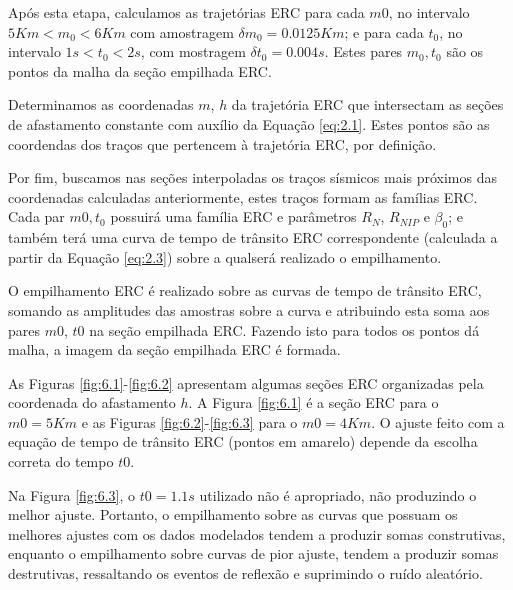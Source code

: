 Após esta etapa, calculamos as trajetórias ERC para cada $m0$, no intervalo $5Km<m_0<6Km$ com amostragem
$\delta m_0 = 0.0125Km$; e para cada $t_0$, no intervalo $1s<t_0<2s$, com mostragem $\delta t_0 = 0.004s$.
Estes pares $m_0, t_0$ são os pontos da malha da seção empilhada ERC.

Determinamos as coordenadas $m$, $h$ da trajetória ERC que intersectam as seções de afastamento constante com
auxílio da Equação \ref{eq:2.1}.
Estes pontos são as coordendas dos traços que pertencem à trajetória ERC, por definição.

Por fim, buscamos nas seções interpoladas
os traços sísmicos mais próximos das coordenadas calculadas anteriormente, estes traços formam as famílias ERC. 
Cada par $m0, t_0$ possuirá uma família ERC e parâmetros $R_N$, $R_{NIP}$ e $\beta_0$; e também terá uma curva de tempo
de trânsito ERC correspondente (calculada a partir da Equação \ref{eq:2.3}) sobre a qualserá realizado o empilhamento.

O empilhamento ERC é realizado sobre as curvas de tempo de trânsito ERC, somando as amplitudes
das amostras sobre a curva e atribuindo esta soma aos pares $m0$, $t0$ na seção empilhada ERC.
Fazendo isto para todos os pontos dá malha, a imagem da seção empilhada ERC é formada.

As Figuras \ref{fig:6.1}-\ref{fig:6.2} apresentam algumas seções ERC organizadas pela coordenada do afastamento $h$. A Figura
\ref{fig:6.1} é a seção ERC para o $m0=5Km$ e as Figuras \ref{fig:6.2}-\ref{fig:6.3} para o $m0=4Km$. O ajuste feito com
a equação de tempo de trânsito ERC (pontos em amarelo) depende da escolha correta do tempo $t0$. 

Na Figura \ref{fig:6.3}, 
o $t0=1.1s$ utilizado não é apropriado, não produzindo o melhor ajuste. Portanto, o empilhamento sobre as curvas que possuam
os melhores ajustes com os dados modelados tendem a produzir somas construtivas, enquanto o empilhamento sobre curvas de
pior ajuste, tendem a produzir somas destrutivas, ressaltando os eventos de reflexão e suprimindo o ruído aleatório.

